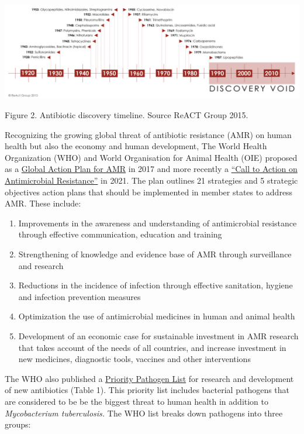 \documentclass[]{tufte-handout}
\providecommand{\tightlist}{%
  \setlength{\itemsep}{0pt}\setlength{\parskip}{0pt}}
\begin{document}
\includegraphics[width=16.66667in,height=\textheight]{images/ab-discovery-timeline.png}

Figure 2. Antibiotic discovery timeline. Source ReACT Group 2015.

Recognizing the growing global threat of antibiotic resistance (AMR) on
human health but also the economy and human development, The World
Health Organization (WHO) and World Organisation for Animal Health (OIE)
proposed as a
\href{https://www.who.int/publications/i/item/9789241509763}{Global
Action Plan for AMR} in 2017 and more recently a
\href{https://www.who.int/news/item/30-07-2021-call-to-action-on-antimicrobial-resistance-2021}{``Call
to Action on Antimicrobial Resistance''} in 2021. The plan outlines 21
strategies and 5 strategic objectives action plans that should be
implemented in member states to address AMR. These include:

\begin{enumerate}
\def\labelenumi{\arabic{enumi}.}
\tightlist
\item
  Improvements in the awareness and understanding of antimicrobial
  resistance through effective communication, education and training
\item
  Strengthening of knowledge and evidence base of AMR through
  surveillance and research
\item
  Reductions in the incidence of infection through effective sanitation,
  hygiene and infection prevention measures
\item
  Optimization the use of antimicrobial medicines in human and animal
  health
\item
  Development of an economic case for sustainable investment in AMR
  research that takes account of the needs of all countries, and
  increase investment in new medicines, diagnostic tools, vaccines and
  other interventions
\end{enumerate}

The WHO also published a
\href{https://www.who.int/medicines/publications/WHO-PPL-Short_Summary_25Feb-ET_NM_WHO.pdf}{Priority
Pathogen List} for research and development of new antibiotics (Table
1). This priority list includes bacterial pathogens that are considered
to be be the biggest threat to human health in addition to
\emph{Mycobacterium tuberculosis.} The WHO list breaks down pathogens
into three groups:
\end{document}
